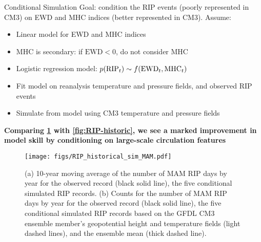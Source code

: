\begin{block}{Conditional Simulation}
  Goal: condition the RIP events (poorly represented in CM3) on EWD and MHC indices (better represented in CM3).
  Assume:
  \begin{itemize}
    \item Linear model for EWD and MHC indices
    \item MHC is secondary: if $\text{EWD}<0$, do not consider MHC
    \item Logistic regression model: $p(\text{RIP}_t) \sim f \qty(\text{EWD}_t, \text{MHC}_t)$
    \item Fit model on reanalysis temperature and pressure fields, and observed RIP events
    \item Simulate from model using CM3 temperature and pressure fields
  \end{itemize}
  \textbf{Comparing \cref{fig:historical-simulations} with \cref{fig:RIP-historic}, we see a marked improvement in model skill by conditioning on large-scale circulation features}
  \begin{figure}[ht]
    \centerline{\texttt{[image: figs/RIP\_historical\_sim\_MAM.pdf]}}
    \caption{
    (a) 10-year moving average of the number of MAM RIP days by year for the observed record (black solid line), the five conditional simulated RIP records.
    (b) Counts for the number of MAM RIP days by year for the observed record (black solid line), the five conditional simulated RIP records based on the GFDL CM3 ensemble member's geopotential height and temperature fields (light dashed lines), and the ensemble mean (thick dashed line).
    }
    \label{fig:historical-simulations}
  \end{figure}
\end{block}
